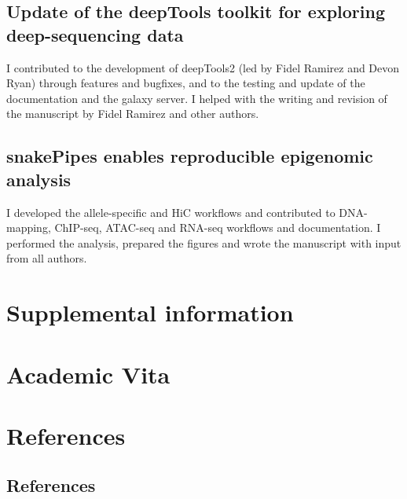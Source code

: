 \documentclass[11pt,twoside]{MPIthesis}
\theoremstyle{definition}
\theoremstyle{definition}
\theoremstyle{definition}
\theoremstyle{remark}
\begin{document}
\section{Update of the deepTools toolkit for exploring deep-sequencing
data}\label{update-of-the-deeptools-toolkit-for-exploring-deep-sequencing-data}

I contributed to the development of deepTools2 (led by Fidel Ramirez and
Devon Ryan) through features and bugfixes, and to the testing and update
of the documentation and the galaxy server. I helped with the writing
and revision of the manuscript by Fidel Ramirez and other authors.



\section{snakePipes enables reproducible epigenomic
analysis}\label{snakepipes-enables-reproducible-epigenomic-analysis}

I developed the allele-specific and HiC workflows and contributed to
DNA-mapping, ChIP-seq, ATAC-seq and RNA-seq workflows and documentation.
I performed the analysis, prepared the figures and wrote the manuscript
with input from all authors.



\chapter{Supplemental information}\label{supplemental-information}

\chapter{Academic Vita}\label{academic-vita}

\backmatter

\chapter*{References}\label{references}

\noindent

\section{References}\label{references-1}
\end{document}
